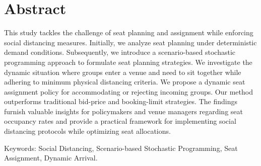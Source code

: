 
\section*{Abstract}
This study tackles the challenge of seat planning and assignment while enforcing social distancing measures. Initially, we analyze seat planning under deterministic demand conditions. Subsequently, we introduce a scenario-based stochastic programming approach to formulate seat planning strategies. We investigate the dynamic situation where groups enter a venue and need to sit together while adhering to minimum physical distancing criteria. We propose a dynamic seat assignment policy for accommodating or rejecting incoming groups. Our method outperforms traditional bid-price and booking-limit strategies. The findings furnish valuable insights for policymakers and venue managers regarding seat occupancy rates and provide a practical framework for implementing social distancing protocols while optimizing seat allocations.


Keywords: Social Distancing, Scenario-based Stochastic Programming, Seat Assignment, Dynamic Arrival.


